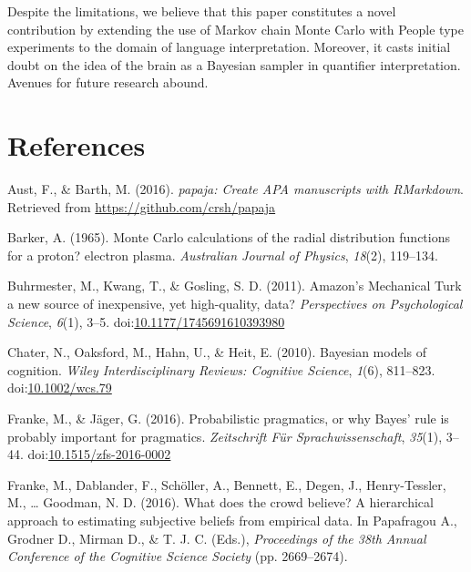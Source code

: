 \documentclass[english,floatsintext,man]{apa6}
\begin{document}
Despite the limitations, we believe that this paper constitutes a novel
contribution by extending the use of Markov chain Monte Carlo with
People type experiments to the domain of language interpretation.
Moreover, it casts initial doubt on the idea of the brain as a Bayesian
sampler in quantifier interpretation. Avenues for future research
abound.

\section{References}\label{references}

\setlength{\parindent}{-0.5in} \setlength{\leftskip}{0.5in}

\hypertarget{refs}{}
\hypertarget{ref-R-papaja}{}
Aust, F., \& Barth, M. (2016). \emph{papaja: Create APA manuscripts with
RMarkdown}. Retrieved from \url{https://github.com/crsh/papaja}

\hypertarget{ref-barker1965monte}{}
Barker, A. (1965). Monte Carlo calculations of the radial distribution
functions for a proton? electron plasma. \emph{Australian Journal of
Physics}, \emph{18}(2), 119--134.

\hypertarget{ref-buhrmester2011amazon}{}
Buhrmester, M., Kwang, T., \& Gosling, S. D. (2011). Amazon's Mechanical
Turk a new source of inexpensive, yet high-quality, data?
\emph{Perspectives on Psychological Science}, \emph{6}(1), 3--5.
doi:\href{https://doi.org/10.1177/1745691610393980}{10.1177/1745691610393980}

\hypertarget{ref-chater2010bayesian}{}
Chater, N., Oaksford, M., Hahn, U., \& Heit, E. (2010). Bayesian models
of cognition. \emph{Wiley Interdisciplinary Reviews: Cognitive Science},
\emph{1}(6), 811--823.
doi:\href{https://doi.org/10.1002/wcs.79}{10.1002/wcs.79}

\hypertarget{ref-franke2016probabilistic}{}
Franke, M., \& Jäger, G. (2016). Probabilistic pragmatics, or why Bayes'
rule is probably important for pragmatics. \emph{Zeitschrift Für
Sprachwissenschaft}, \emph{35}(1), 3--44.
doi:\href{https://doi.org/10.1515/zfs-2016-0002}{10.1515/zfs-2016-0002}

\hypertarget{ref-franke2016cogsci}{}
Franke, M., Dablander, F., Schöller, A., Bennett, E., Degen, J.,
Henry-Tessler, M., \ldots{} Goodman, N. D. (2016). What does the crowd
believe? A hierarchical approach to estimating subjective beliefs from
empirical data. In Papafragou A., Grodner D., Mirman D., \& T. J. C.
(Eds.), \emph{Proceedings of the 38th Annual Conference of the Cognitive
Science Society} (pp. 2669--2674).
\end{document}
